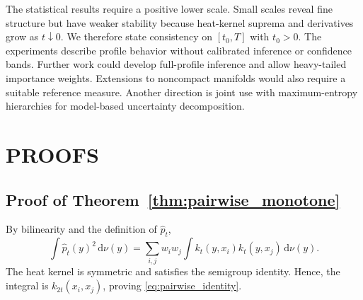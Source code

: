 \documentclass[twoside]{article}
\theoremstyle{definition}
\theoremstyle{remark}
\newcommand{\dd}{\,\mathrm{d}}
\begin{document}
The statistical results require a positive lower scale. Small scales reveal fine structure but have weaker stability because heat-kernel suprema and derivatives grow as $t\downarrow0$. We therefore state consistency on $[t_0,T]$ with $t_0>0$. The experiments describe profile behavior without calibrated inference or confidence bands. Further work could develop full-profile inference and allow heavy-tailed importance weights. Extensions to noncompact manifolds would also require a suitable reference measure. Another direction is joint use with maximum-entropy hierarchies for model-based uncertainty decomposition.















\appendix



\section{PROOFS}\label{app:proofs}

\subsection{Proof of Theorem~\ref{thm:pairwise_monotone}}
By bilinearity and the definition of $\widehat p_t$,
\begin{equation*}
\int \widehat p_t(y)^2\dd\nu(y)
=\sum_{i,j}w_iw_j\int k_t(y,x_i)k_t(y,x_j)\dd\nu(y).
\end{equation*}
The heat kernel is symmetric and satisfies the semigroup identity. Hence, the integral is $k_{2t}(x_i,x_j)$, proving \eqref{eq:pairwise_identity}.
\end{document}
